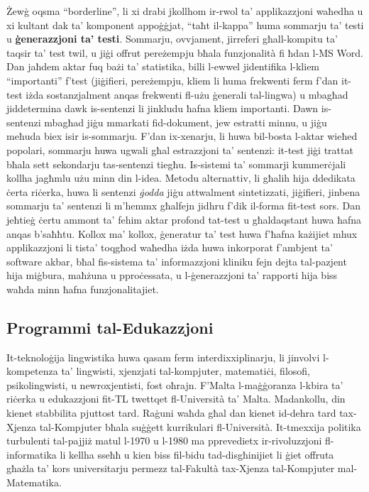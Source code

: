 \documentclass[]{../../metanetpaper}
\begin{document}
\begin{multicols}{2}
Żewġ oqsma ``borderline'', li xi drabi jkollhom ir-rwol ta’ applikazzjoni waħedha u xi kultant dak ta’ komponent appoġġjat, ``taħt il-kappa'' huma sommarju ta’ testi u \textbf{ġenerazzjoni ta’ testi}. Sommarju, ovvjament, jirreferi għall-kompitu ta’ taqsir ta’ test twil, u jiġi offrut pereżempju bħala funzjonalità fi ħdan l-MS Word. Dan jaħdem aktar fuq bażi ta’ statistika, billi l-ewwel jidentifika l-kliem ``importanti'' f’test (jiġifieri, pereżempju, kliem li huma frekwenti ferm f'dan it-test iżda sostanzjalment anqas frekwenti fl-użu ġenerali tal-lingwa) u mbagħad jiddetermina dawk is-sentenzi li jinkludu ħafna kliem importanti. Dawn is-sentenzi mbagħad jiġu mmarkati fid-dokument, jew estratti minnu, u jiġu meħuda biex isir is-sommarju. F’dan ix-xenarju, li huwa bil-bosta l-aktar wieħed popolari, sommarju huwa ugwali għal estrazzjoni ta’ sentenzi: it-test jiġi trattat bħala sett sekondarju tas-sentenzi tiegħu. Is-sistemi ta’ sommarji kummerċjali kollha jagħmlu użu minn din l-idea. Metodu alternattiv, li għalih hija ddedikata ċerta riċerka, huwa li sentenzi \emph{ġodda} jiġu attwalment sintetizzati, jiġifieri, jinbena sommarju ta’ sentenzi li m’hemmx għalfejn jidhru f’dik il-forma fit-test sors. Dan jeħtieġ ċertu ammont ta’ fehim aktar profond tat-test u għaldaqstant huwa ħafna anqas b'saħħtu. Kollox ma’ kollox, ġeneratur ta’ test huwa f’ħafna każijiet mhux applikazzjoni li tista’ toqgħod waħedha iżda huwa inkorporat f’ambjent ta’ software akbar, bħal fis-sistema ta’ informazzjoni kliniku fejn dejta tal-pazjent hija miġbura, maħżuna u pproċessata, u l-ġenerazzjoni ta’ rapporti hija biss waħda minn ħafna funzjonalitajiet.

\subsection{Programmi tal-Edukazzjoni}

It-teknoloġija lingwistika huwa qasam ferm interdixxiplinarju, li jinvolvi l-kompetenza ta’ lingwisti, xjenzjati tal-kompjuter, matematiċi, filosofi, psikolingwisti, u newroxjentisti, fost oħrajn. F'Malta l-maġġoranza l-kbira ta’ riċerka u edukazzjoni fit-TL twettqet fl-Università ta’ Malta. Madankollu, din kienet stabbilita pjuttost tard. Raġuni waħda għal dan kienet id-dehra tard tax-Xjenza tal-Kompjuter bħala suġġett kurrikulari fl-Università. It-tmexxija politika turbulenti tal-pajjiż matul l-1970 u l-1980 ma pprevedietx ir-rivoluzzjoni fl-informatika li kellha sseħħ u kien biss fil-bidu tad-disgħinijiet li ġiet offruta għażla ta’ kors universitarju permezz tal-Fakultà tax-Xjenza tal-Kompjuter mal-Matematika.


\end{multicols}
\end{document}
